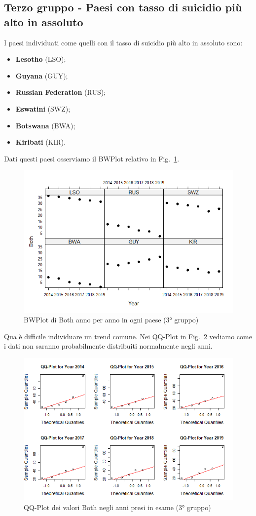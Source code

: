 \documentclass[conference]{IEEEtran}
\begin{document}
\subsection{Terzo gruppo - Paesi con tasso di suicidio più alto in assoluto}

I paesi individuati come quelli con il tasso di suicidio più alto
in assoluto sono:
\begin{itemize}
    \item \textbf{Lesotho} (LSO);
    \item \textbf{Guyana} (GUY);
    \item \textbf{Russian Federation} (RUS);
    \item \textbf{Eswatini} (SWZ);
    \item \textbf{Botswana} (BWA);
    \item \textbf{Kiribati} (KIR). 
\end{itemize}
Dati questi paesi osserviamo il BWPlot relativo in Fig.~\ref{9thridgroup}.
\begin{figure}[htbp]
    \centerline{\includegraphics[width=.5\textwidth]{img/9 - Thirdgroup.png}}
    \caption{BWPlot di Both anno per anno in ogni paese (3° gruppo)}
    \label{9thridgroup}
\end{figure}
Qua è difficile individuare un trend comune.
Nei QQ-Plot in Fig.~\ref{10thirdqq} vediamo come i dati non saranno
probabilmente distribuiti normalmente negli anni.
\begin{figure}[htbp]
    \centerline{\includegraphics[width=.5\textwidth]{img/10 - Thirdqq.png}}
    \caption{QQ-Plot dei valori Both negli anni presi in esame (3° gruppo)}
    \label{10thirdqq}
\end{figure}
\end{document}
